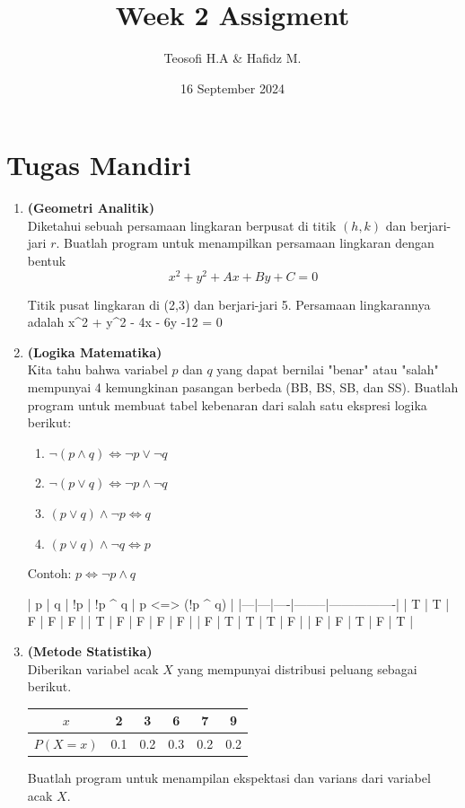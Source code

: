 \documentclass{article}
\title{\textbf{Week 2 Assigment}}
\date{16 September 2024}
\author{Teosofi H.A \& Hafidz M.}
\begin{document}
    \maketitle

    \section*{Tugas Mandiri}
    \begin{enumerate}
        \item[] \textbf{(Geometri Analitik)}\\
        Diketahui sebuah persamaan lingkaran berpusat di titik $(h,k)$ dan berjari-jari $r$. Buatlah program untuk menampilkan persamaan lingkaran dengan bentuk
        \[x^2+y^2+Ax+By+C=0\]
        \begin{RunCode}{}
Titik pusat lingkaran di (2,3) dan berjari-jari 5.
Persamaan lingkarannya adalah x^2 + y^2 - 4x - 6y -12 = 0
        \end{RunCode}
        
        \item[] \textbf{(Logika Matematika)}\\
        Kita tahu bahwa variabel $p$ dan $q$ yang dapat bernilai "benar" atau "salah" mempunyai 4 kemungkinan pasangan berbeda (BB, BS, SB, dan SS). Buatlah program untuk membuat tabel kebenaran dari salah satu ekspresi logika berikut:
        \begin{enumerate}[label=$\boxed{\text{\Alph*}}$]
            \item $\neg(p \land q) \Leftrightarrow \neg p \lor \neg q$  
            \item $\neg(p \lor q) \Leftrightarrow \neg p \land \neg q$ 
            \item $(p \lor q)\land \neg p \Leftrightarrow q$
            \item $(p \lor q)\land \neg q \Leftrightarrow p$
        \end{enumerate}
        Contoh: $p\Leftrightarrow \neg p \land q$
        \begin{RunCode}{}
| p | q | !p | !p ^ q | p <=> (!p ^ q) |
|---|---|----|--------|----------------|
| T | T | F  | F      | F              |
| T | F | F  | F      | F              |
| F | T | T  | T      | F              |
| F | F | T  | F      | T              |
        \end{RunCode}

        \item[] \textbf{(Metode Statistika)}\\
        Diberikan variabel acak $X$ yang mempunyai distribusi peluang sebagai berikut.
        \begin{center}
            \begin{tabular}{|c|c|c|c|c|c|}
                \hline
                $x$ & 2 & 3 & 6 & 7 & 9\\
                \hline
                $P(X=x)$ & 0.1 & 0.2 & 0.3 & 0.2 & 0.2\\
                \hline
            \end{tabular}
        \end{center}
        Buatlah program untuk menampilan ekspektasi dan varians dari variabel acak $X$.
    \end{enumerate}
\end{document}
